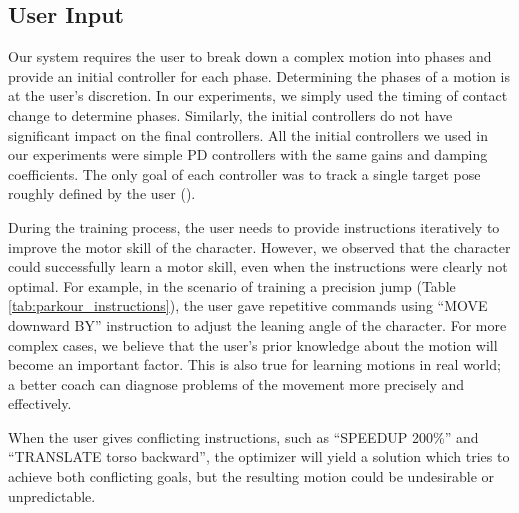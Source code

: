 \subsection{User Input}
Our system requires the user to break down a complex motion into
phases and provide an initial controller for each phase. Determining
the phases of a motion is at the user's discretion. In our
experiments, we simply used the timing of contact change to determine
phases. Similarly, the initial controllers do not have significant impact
on the final controllers. All the initial
controllers we used in our experiments were simple PD controllers with
the same gains and damping coefficients. The
only goal of each controller was to track a single target pose roughly defined
by the user ().


During the training process, the user needs to provide instructions
iteratively to improve the motor skill of the character. However, we
observed that the character could successfully learn a motor skill,
even when the instructions were clearly not optimal. For example, in
the scenario of training a precision jump (Table \ref{tab:parkour_instructions}),
the user gave repetitive commands using ``MOVE downward BY'' instruction
to adjust the leaning angle of the character.
For more complex cases, we believe that the user's
prior knowledge about the motion will become an important factor. This
is also true for learning motions in real world; a better coach can
diagnose problems of the movement more precisely and effectively.  

When the user gives conflicting instructions,
such as ``SPEEDUP 200\%'' and ``TRANSLATE torso backward'',
the optimizer will yield a solution which tries to achieve both conflicting goals,
but the resulting motion could be undesirable or unpredictable.


